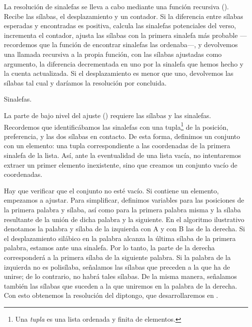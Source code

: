 La resolución de sinalefas se lleva a cabo mediante una función recursiva (). Recibe las sílabas, el desplazamiento y un contador. Si la diferencia entre sílabas esperadas y encontradas es positiva, calcula las sinalefas potenciales del verso, incrementa el contador, ajusta las sílabas con la primera sinalefa más probable —recordemos que la función de encontrar sinalefas las ordenaba—, y devolvemos una llamada recursiva a la propia función, con las sílabas ajustadas como argumento, la diferencia decrementada en uno por la sinalefa que hemos hecho y la cuenta actualizada. Si el desplazamiento es menor que uno, devolvemos las sílabas tal cual y daríamos la resolución por concluida.

\begin{algorithm}[!ht]
	\caption{Sinalefas.}\label{list:VerSeMetre9}
\end{algorithm}

La parte de bajo nivel del ajuste () requiere las sílabas y las sinalefas. Recordemos que identificábamos las sinalefas con una tupla\footnote{Una \textit{tupla} es una lista ordenada y finita de elementos.} de la posición, preferencia,  y las dos sílabas en contacto. De esta forma, definimos un conjunto con un elemento: una tupla correspondiente a las coordenadas de la primera sinalefa de la lista. Así, ante la eventualidad de una lista vacía, no intentaremos extraer un primer elemento inexistente, sino que creamos un conjunto vacío de coordenadas.

Hay que verificar que el conjunto no esté vacío. Si contiene un elemento, empezamos a ajustar. Para simplificar, definimos variables para las posiciones de la primera palabra y sílaba, así como para la primera palabra misma y la sílaba resultante de la unión de dicha palabra y la siguiente. En el algoritmo ilustrativo denotamos la palabra y sílaba de la izquierda con A y con B las de la derecha. Si el desplazamiento silábico en la palabra alcanza la última sílaba de la primera palabra, estamos ante una sinalefa. Por lo tanto, la parte de la derecha corresponderá a la primera sílaba de la siguiente palabra. Si la palabra de la izquierda no es polisílaba, señalamos las sílabas que preceden a la que ha de unirse; de lo contrario, no habrá tales sílabas. De la misma manera, señalamos también las sílabas que suceden a la que uniremos en la palabra de la derecha. Con esto obtenemos la resolución del diptongo, que desarrollaremos en .


